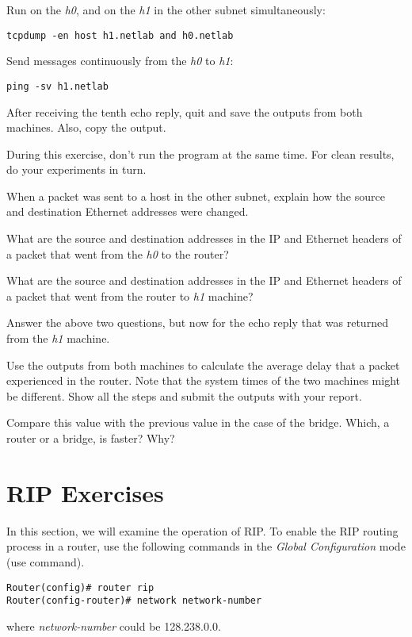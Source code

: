 \documentclass{../UTNetLab}
\begin{document}
Run  on the \textit{h0}, and  on the \textit{h1} in the other subnet simultaneously:
\begin{lstlisting}[emph={h0,h1,netlab},morekeywords={[3]host,and}]
tcpdump -en host h1.netlab and h0.netlab
    \end{lstlisting}
Send  messages continuously from the \textit{h0} to \textit{h1}:
\begin{lstlisting}[emph={h1, netlab}]
ping -sv h1.netlab
    \end{lstlisting}
After receiving the tenth echo reply, quit  and save the  outputs from both machines.
Also, copy the  output.

During this exercise, don’t run the  program at the same time.
For clean results, do your experiments in turn.

\begin{report}
    \item When a packet was sent to a host in the other subnet, explain how the source and destination Ethernet addresses were changed.

    \item What are the source and destination addresses in the IP and Ethernet headers of a packet that went from the \textit{h0} to the router?

    \item What are the source and destination addresses in the IP and Ethernet headers of a packet that went from the router to \textit{h1} machine?

    \item Answer the above two questions, but now for the echo reply that was returned from the \textit{h1} machine.

    \item Use the  outputs from both machines to calculate the average delay that a packet experienced in the router.
    Note that the system times of the two machines might be different.
    Show all the steps and submit the  outputs with your report.

    \item Compare this value with the previous value in the case of the bridge.
    Which, a router or a bridge, is faster? Why?
\end{report}

\part{RIP Exercises}\label{sec:rip}
In this section, we will examine the operation of RIP.
To enable the RIP routing process in a router, use the following commands in the \textit{Global Configuration} mode (use  command).
\begin{lstlisting}[language={cisco}, emph={network-number}]
Router(config)# router rip
Router(config-router)# network network-number
    \end{lstlisting}
where \textit{network-number} could be 128.238.0.0.
\end{document}
